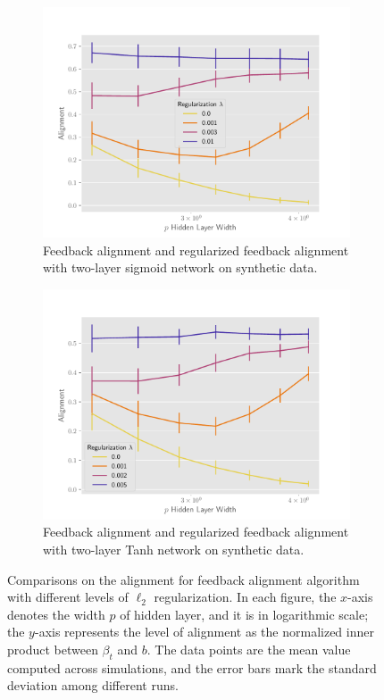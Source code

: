 \begin{figure}[h]
\begin{subfigure}[b]{.49\textwidth}
\end{subfigure}
\medskip
\begin{subfigure}[b]{.49\textwidth}
  \centering
  \includegraphics[width=\linewidth]{figures/align_nn_sigmoid_autograd_l2_v6.pdf}
  \caption{Feedback alignment and regularized feedback alignment with two-layer sigmoid network on synthetic data.}
  \label{fig:align_nn_sigmoid_autograd_l2}
\end{subfigure}\hfill
\begin{subfigure}[b]{.49\textwidth}
  \centering
  \includegraphics[width=\linewidth]{figures/align_nn_tanh_autograd_l2_v6.pdf}
  \caption{Feedback alignment and regularized feedback alignment with two-layer Tanh network on synthetic data.}
  \label{fig:align_nn_tanh_autograd_l2}
\end{subfigure}
\caption{Comparisons on the alignment for feedback alignment algorithm with different levels of $\ell_2$ regularization. In each figure, the $x$-axis denotes the width $p$ of hidden layer, and it is in logarithmic scale; the $y$-axis represents the level of alignment as the normalized inner product between $\beta_t$ and $b$. The data points are the mean value computed across simulations, and the error bars mark the standard deviation among different runs.}
\label{fig:synthetic-l2}
\end{figure}

